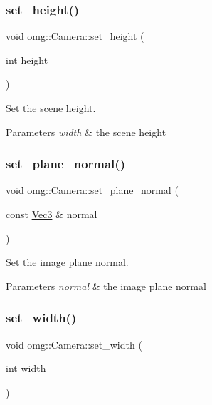 \subsubsection{\texorpdfstring{set\_height()}{set\_height()}}
{\footnotesize\ttfamily void omg\+::\+Camera\+::set\+\_\+height (\begin{DoxyParamCaption}\item[{int}]{height }\end{DoxyParamCaption})\hspace{0.3cm}{\ttfamily [inline]}}



Set the scene height. 


\begin{DoxyParams}{Parameters}
{\em width} & the scene height \\
\hline
\end{DoxyParams}
\mbox{\label{classomg_1_1_camera_a5983a689364dd5c9701e157b4620c2cd}} 
\subsubsection{\texorpdfstring{set\_plane\_normal()}{set\_plane\_normal()}}
{\footnotesize\ttfamily void omg\+::\+Camera\+::set\+\_\+plane\+\_\+normal (\begin{DoxyParamCaption}\item[{const \mbox{\hyperlink{namespaceomg_acf927839a305877d454c507f0b96730b}{Vec3}} \&}]{normal }\end{DoxyParamCaption})\hspace{0.3cm}{\ttfamily [inline]}}



Set the image plane normal. 


\begin{DoxyParams}{Parameters}
{\em normal} & the image plane normal \\
\hline
\end{DoxyParams}
\mbox{\label{classomg_1_1_camera_a3ef1ff0d4ca0deb6b32b5e08d7dcb159}} 
\subsubsection{\texorpdfstring{set\_width()}{set\_width()}}
{\footnotesize\ttfamily void omg\+::\+Camera\+::set\+\_\+width (\begin{DoxyParamCaption}\item[{int}]{width }\end{DoxyParamCaption})\hspace{0.3cm}{\ttfamily [inline]}}



